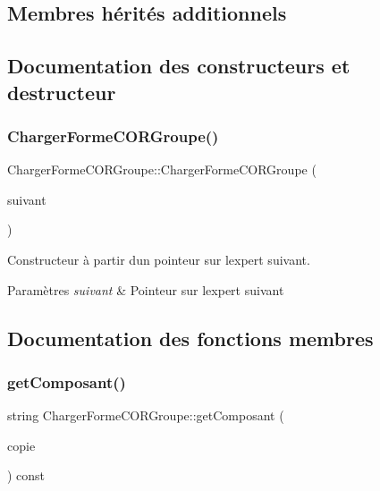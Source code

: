 \subsection*{Membres hérités additionnels}


\subsection{Documentation des constructeurs et destructeur}
\mbox{\label{class_charger_forme_c_o_r_groupe_a8af20b68260a8e445aeb0163631f6a66}} 
\subsubsection{\texorpdfstring{ChargerFormeCORGroupe()}{ChargerFormeCORGroupe()}}
{\footnotesize\ttfamily Charger\+Forme\+C\+O\+R\+Groupe\+::\+Charger\+Forme\+C\+O\+R\+Groupe (\begin{DoxyParamCaption}\item[{\mbox{\hyperlink{class_charger_forme_c_o_r}{Charger\+Forme\+C\+OR}} $\ast$}]{suivant }\end{DoxyParamCaption})}



Constructeur à partir d\textquotesingle{}un pointeur sur l\textquotesingle{}expert suivant. 


\begin{DoxyParams}{Paramètres}
{\em suivant} & Pointeur sur l\textquotesingle{}expert suivant \\
\hline
\end{DoxyParams}


\subsection{Documentation des fonctions membres}
\mbox{\label{class_charger_forme_c_o_r_groupe_a6a9f6502bd3d05670a69c8eca418ce06}} 
\subsubsection{\texorpdfstring{getComposant()}{getComposant()}}
{\footnotesize\ttfamily string Charger\+Forme\+C\+O\+R\+Groupe\+::get\+Composant (\begin{DoxyParamCaption}\item[{string \&}]{copie }\end{DoxyParamCaption}) const}



